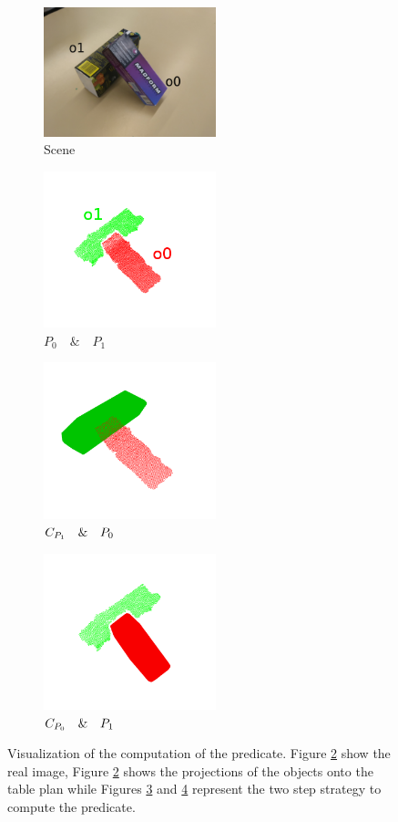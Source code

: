 \begin{figure}[h]
\centering
\begin{subfigure}[t]{0.45\textwidth}
\centering
\includegraphics[width=5cm]{Img/on/on1.jpg}
\caption{Scene}\label{fig:on_predicate_original}
\end{subfigure}
\begin{subfigure}[t]{0.45\textwidth}
\centering
\includegraphics[width=5cm]{Img/on/on2.png}
\caption{$P_0 \quad \& \quad P_1$}\label{fig:on_1}
\end{subfigure}
\begin{subfigure}[t]{0.45\textwidth}
\centering
\includegraphics[width=5cm]{Img/on/on4.png}
\caption{${\sc C_{P_{1}}} \quad \& \quad {\sc P_{0}}$}\label{fig:on_2}
\end{subfigure}
\begin{subfigure}[t]{0.45\textwidth}
\centering
\includegraphics[width=5cm]{Img/on/on3.png}
\caption{${\sc C_{P_{0}}} \quad \& \quad {\sc P_{1}}$}\label{fig:on_3}
\end{subfigure}
\caption{Visualization of the computation of the  predicate. Figure \ref{fig:on_1} show the real image, Figure \ref{fig:on_1} shows the projections of the objects onto the table plan while Figures \ref{fig:on_2} and \ref{fig:on_3} represent the two step strategy to compute the  predicate.}\label{fig:on_predicate}
\end{figure}

